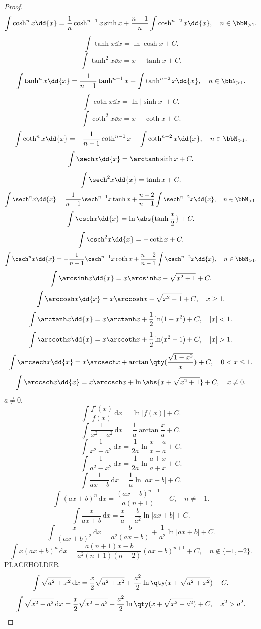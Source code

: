 \documentclass[a4paper,12pt]{report}
\begin{document}
\begin{itemize}
\begin{itemize}
\begin{proof}
\[\int\cosh^nx\dd{x}=\frac{1}{n}\cosh^{n-1}x\sinh x+\frac{n-1}{n}\int\cosh^{n-2}x\dd{x},\quad n\in\bbN_{>1}.\]
\[\int\tanh x\dd{x}=\ln\cosh x+C.\]
\[\int\tanh^2x\dd{x}=x-\tanh x+C.\]
\[\int\tanh^nx\dd{x}=\frac{1}{n-1}\tanh^{n-1}x-\int\tanh^{n-2}x\dd{x},\quad n\in\bbN_{>1}.\]
\[\int\coth x\dd{x}=\ln|\sinh x|+C.\]
\[\int\coth^2x\dd{x}=x-\coth x+C.\]
\[\int\coth^nx\dd{x}=-\frac{1}{n-1}\coth^{n-1}x-\int\coth^{n-2}x\dd{x},\quad n\in\bbN_{>1}.\]
\[\int\sech x\dd{x}=\arctanh\sinh x+C.\]
\[\int\sech^2x\dd{x}=\tanh x+C.\]
\[\int\sech^nx\dd{x}=\frac{1}{n-1}\sech^{n-1}x\tanh x+\frac{n-2}{n-1}\int\sech^{n-2}x\dd{x},\quad n\in\bbN_{>1}.\]
\[\int\csch x\dd{x}=\ln\abs{\tanh\frac{x}{2}}+C.\]
\[\int\csch^2x\dd{x}=-\coth x+C.\]
\[\int\csch^nx\dd{x}=-\frac{1}{n-1}\csch^{n-1}x\coth x+\frac{n-2}{n-1}\int\csch^{n-2}x\dd{x},\quad n\in\bbN_{>1}.\]
\[\int\arcsinh x\dd{x}=x\arcsinh x-\sqrt{x^2+1}+C.\]
\[\int\arccosh x\dd{x}=x\arccosh x-\sqrt{x^2-1}+C,\quad x\geq 1.\]
\[\int\arctanh x\dd{x}=x\arctanh x+\frac{1}{2}\ln(1-x^2)+C,\quad|x|<1.\]
\[\int\arccoth x\dd{x}=x\arccoth x+\frac{1}{2}\ln(x^2-1)+C,\quad|x|>1.\]
\[\int\arcsech x\dd{x}=x\arcsech x+\arctan\qty(\frac{\sqrt{1-x^2}}{x})+C,\quad 0<x\leq 1.\]
\[\int\arccsch x\dd{x}=x\arccsch x+\ln\abs{x+\sqrt{x^2+1}}+C,\quad x\neq 0.\]
$a\neq 0$.
\[\int\frac{f'(x)}{f(x)}\,\mathrm{d}x=\ln|f(x)|+C.\]
\[\int\frac{1}{x^2+a^2}\,\mathrm{d}x=\frac{1}{a}\arctan\frac{x}{a}+C.\]
\[\int\frac{1}{x^2-a^2}\,\mathrm{d}x=\frac{1}{2a}\ln\frac{x-a}{x+a}+C.\]
\[\int\frac{1}{a^2-x^2}\,\mathrm{d}x=\frac{1}{2a}\ln\frac{a+x}{a+x}+C.\]
\[\int\frac{1}{ax+b}\,\mathrm{d}x=\frac{1}{a}\ln|ax+b|+C.\]
\[\int(ax+b)^n\,\mathrm{d}x=\frac{(ax+b)^{n-1}}{a(n+1)}+C,\quad n\neq -1.\]
\[\int\frac{x}{ax+b}\,\mathrm{d}x=\frac{x}{a}-\frac{b}{a^2}\ln|ax+b|+C.\]
\[\int\frac{x}{(ax+b)^2}\,\mathrm{d}x=\frac{b}{a^2(ax+b)}+\frac{1}{a^2}\ln|ax+b|+C.\]
\[\int x(ax+b)^n\,\mathrm{d}x=\frac{a(n+1)x-b}{a^2(n+1)(n+2)}(ax+b)^{n+1}+C,\quad n\notin\{-1,-2\}.\]
PLACEHOLDER
\[\int\sqrt{a^2+x^2}\,\mathrm{d}x=\frac{x}{2}\sqrt{a^2+x^2}+\frac{a^2}{2}\ln\qty(x+\sqrt{a^2+x^2})+C.\]
\[\int\sqrt{x^2-a^2}\,\mathrm{d}x=\frac{x}{2}\sqrt{x^2-a^2}-\frac{a^2}{2}\ln\qty(x+\sqrt{x^2-a^2})+C,\quad x^2>a^2.\]

\end{proof}
\end{itemize}
\end{itemize}
\end{document}
